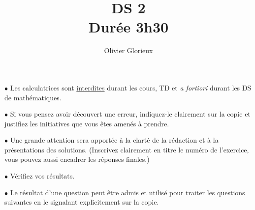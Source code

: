 \documentclass[a4paper, 11pt,reqno]{article}
\author{Olivier Glorieux}
\begin{document}
\title{DS 2\\
\Large{Durée 3h30}
}

\vspace{1cm}
\begin{center}

\begin{description}
\item$\bullet$ Les calculatrices sont \underline{interdites} durant les cours, TD et \emph{a fortiori} durant les DS de mathématiques. \\

\item $\bullet $ Si vous pensez avoir découvert une erreur, indiquez-le clairement sur la copie et justifiez les initiatives que vous êtes amenés à prendre. \\

\item $\bullet$ Une grande attention sera apportée à la clarté de la rédaction et à la présentations des solutions. (Inscrivez clairement en titre le numéro de l'exercice, vous pouvez aussi encadrer les réponses finales.)  \\

\item $\bullet$ Vérifiez vos résultats. \\

\item $\bullet$ Le résultat d'une question peut être admis et utilisé pour traiter les questions suivantes en le signalant explicitement sur la copie. 
\end{description}

\end{center} 
\vspace{2cm}

\begin{exercice}

\end{exercice}
\end{document}
